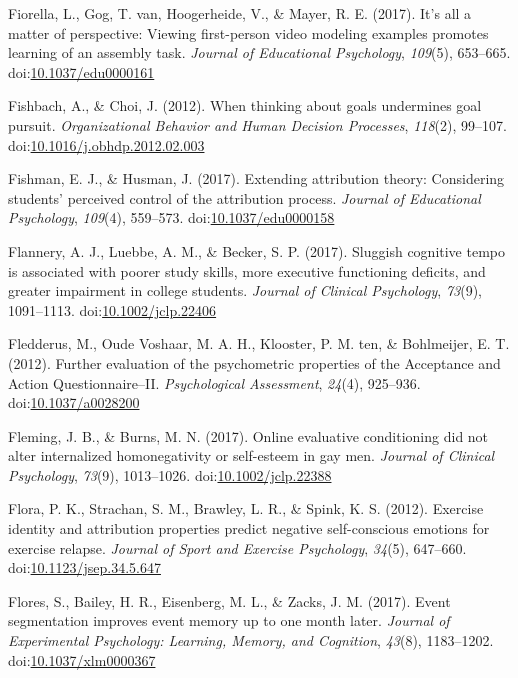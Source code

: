 \documentclass[english,man]{apa6}
\theoremstyle{definition}
\theoremstyle{definition}
\theoremstyle{definition}
\theoremstyle{remark}
\begin{document}
\hypertarget{ref-Fiorella2017}{}
Fiorella, L., Gog, T. van, Hoogerheide, V., \& Mayer, R. E. (2017). It's
all a matter of perspective: Viewing first-person video modeling
examples promotes learning of an assembly task. \emph{Journal of
Educational Psychology}, \emph{109}(5), 653--665.
doi:\href{https://doi.org/10.1037/edu0000161}{10.1037/edu0000161}

\hypertarget{ref-Fishbach2012}{}
Fishbach, A., \& Choi, J. (2012). When thinking about goals undermines
goal pursuit. \emph{Organizational Behavior and Human Decision
Processes}, \emph{118}(2), 99--107.
doi:\href{https://doi.org/10.1016/j.obhdp.2012.02.003}{10.1016/j.obhdp.2012.02.003}

\hypertarget{ref-Fishman2017}{}
Fishman, E. J., \& Husman, J. (2017). Extending attribution theory:
Considering students' perceived control of the attribution process.
\emph{Journal of Educational Psychology}, \emph{109}(4), 559--573.
doi:\href{https://doi.org/10.1037/edu0000158}{10.1037/edu0000158}

\hypertarget{ref-Flannery2017}{}
Flannery, A. J., Luebbe, A. M., \& Becker, S. P. (2017). Sluggish
cognitive tempo is associated with poorer study skills, more executive
functioning deficits, and greater impairment in college students.
\emph{Journal of Clinical Psychology}, \emph{73}(9), 1091--1113.
doi:\href{https://doi.org/10.1002/jclp.22406}{10.1002/jclp.22406}

\hypertarget{ref-Fledderus2012}{}
Fledderus, M., Oude Voshaar, M. A. H., Klooster, P. M. ten, \&
Bohlmeijer, E. T. (2012). Further evaluation of the psychometric
properties of the Acceptance and Action Questionnaire--II.
\emph{Psychological Assessment}, \emph{24}(4), 925--936.
doi:\href{https://doi.org/10.1037/a0028200}{10.1037/a0028200}

\hypertarget{ref-Fleming2017}{}
Fleming, J. B., \& Burns, M. N. (2017). Online evaluative conditioning
did not alter internalized homonegativity or self-esteem in gay men.
\emph{Journal of Clinical Psychology}, \emph{73}(9), 1013--1026.
doi:\href{https://doi.org/10.1002/jclp.22388}{10.1002/jclp.22388}

\hypertarget{ref-Flora2012}{}
Flora, P. K., Strachan, S. M., Brawley, L. R., \& Spink, K. S. (2012).
Exercise identity and attribution properties predict negative
self-conscious emotions for exercise relapse. \emph{Journal of Sport and
Exercise Psychology}, \emph{34}(5), 647--660.
doi:\href{https://doi.org/10.1123/jsep.34.5.647}{10.1123/jsep.34.5.647}

\hypertarget{ref-Flores2017}{}
Flores, S., Bailey, H. R., Eisenberg, M. L., \& Zacks, J. M. (2017).
Event segmentation improves event memory up to one month later.
\emph{Journal of Experimental Psychology: Learning, Memory, and
Cognition}, \emph{43}(8), 1183--1202.
doi:\href{https://doi.org/10.1037/xlm0000367}{10.1037/xlm0000367}
\end{document}
